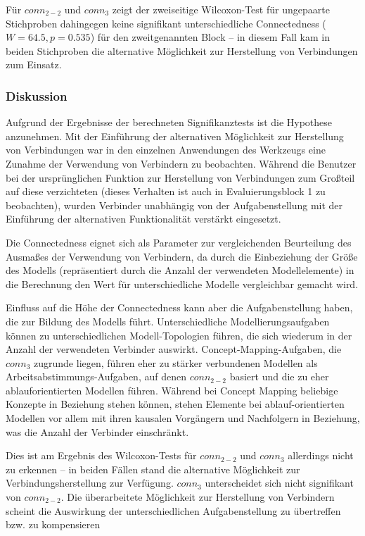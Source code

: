 Für $conn_{2-2}$ und $conn_{3}$ zeigt der zweiseitige Wilcoxon-Test für ungepaarte Stichproben dahingegen keine signifikant unterschiedliche Connectedness ($W=64.5, p=0.535$) für den zweitgenannten Block -- in diesem Fall kam in beiden Stichproben die alternative Möglichkeit zur Herstellung von Verbindungen zum Einsatz.

\subsubsection{Diskussion} %

Aufgrund der Ergebnisse der berechneten Signifikanztests ist die Hypothese anzunehmen. Mit der Einführung der alternativen Möglichkeit zur Herstellung von Verbindungen war in den einzelnen Anwendungen des Werkzeugs eine Zunahme der Verwendung von Verbindern zu beobachten. Während die Benutzer bei der ursprünglichen Funktion zur Herstellung von Verbindungen zum Großteil auf diese verzichteten (dieses Verhalten ist auch in Evaluierungsblock 1 zu beobachten), wurden Verbinder unabhängig von der Aufgabenstellung mit der Einführung der alternativen Funktionalität verstärkt eingesetzt.

Die Connectedness eignet sich als Parameter zur vergleichenden Beurteilung des Ausmaßes der Verwendung von Verbindern, da durch die Einbeziehung der Größe des Modells (repräsentiert durch die Anzahl der verwendeten Modellelemente) in die Berechnung den Wert für unterschiedliche Modelle vergleichbar gemacht wird. 

Einfluss auf die Höhe der Connectedness kann aber die Aufgabenstellung haben, die zur Bildung des Modells führt. Unterschiedliche Modellierungsaufgaben können zu unterschiedlichen Modell-Topologien führen, die sich wiederum in der Anzahl der verwendeten Verbinder auswirkt. Concept-Mapping-Aufgaben, die $conn_{3}$ zugrunde liegen, führen eher zu stärker verbundenen Modellen als Arbeitsabstimmungs-Aufgaben, auf denen $conn_{2-2}$ basiert und die zu eher ablauforientierten Modellen führen. Während bei Concept Mapping beliebige Konzepte in Beziehung stehen können, stehen Elemente bei ablauf-orientierten Modellen vor allem mit ihren kausalen Vorgängern und Nachfolgern in Beziehung, was die Anzahl der Verbinder einschränkt.

Dies ist am Ergebnis des Wilcoxon-Tests für $conn_{2-2}$ und $conn_{3}$ allerdings nicht zu erkennen -- in beiden Fällen stand die alternative Möglichkeit zur Verbindungsherstellung zur Verfügung. $conn_{3}$ unterscheidet sich nicht signifikant von $conn_{2-2}$. Die überarbeitete Möglichkeit zur Herstellung von Verbindern scheint die Auswirkung der unterschiedlichen Aufgabenstellung zu übertreffen bzw. zu kompensieren


